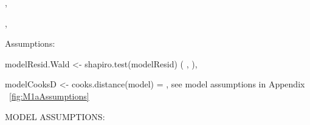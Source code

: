 \CIstart
,
\CIfinish


,



Assumptions:

modelResid.Wald <- shapiro.test(modelResid)
(
  \resdist
    ,
  \pvalue
),

modelCooksD <- cooks.distance(model)
\cooksD
=
  , see model assumptions in Appendix  ~\ref{fig:M1aAssumptions}


















MODEL ASSUMPTIONS:

